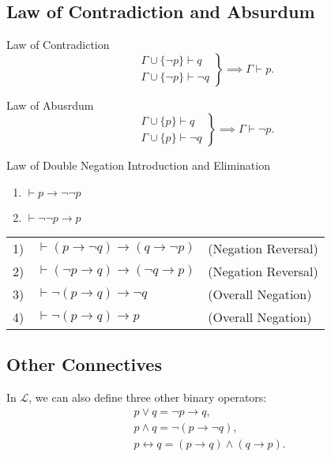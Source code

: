 \documentclass[11pt]{elegantbook}
\begin{document}
\subsection{Law of Contradiction and Absurdum}
\begin{theorem}{Law of Contradiction}
    \[
    \left.
    \begin{array}{l}
    \Gamma \cup \{\neg p\} \vdash q \\
    \Gamma \cup \{\neg p\} \vdash \neg q
    \end{array}
    \right\}
    \implies \Gamma \vdash p.
    \]
\end{theorem}

\begin{theorem}{Law of Abusrdum}
    \[
    \left.
    \begin{array}{l}
    \Gamma \cup \{p\} \vdash q \\
    \Gamma \cup \{p\} \vdash \neg q
    \end{array}
    \right\}
    \implies \Gamma \vdash \neg p.
    \]
\end{theorem}

\begin{corollary}{Law of Double Negation Introduction and Elimination}
    \begin{enumerate}
        \item \(\vdash p \to \neg\neg p\) 
        \item \(\vdash \neg\neg p \to p\) 
    \end{enumerate}
\end{corollary}

\begin{proposition}
    \begin{tabular}{@{}l l l@{}}
    1) & \(\vdash (p \to \neg q) \to (q \to \neg p)\) & \quad (Negation Reversal) \\
    2) & \(\vdash (\neg p\to q)\to (\neg q\to p)\) & \quad (Negation Reversal) \\
    3) & \(\vdash \neg(p\to q)\to \neg q\) & \quad (Overall Negation) \\
    4) & \(\vdash \neg(p\to q)\to p\) & \quad (Overall Negation) \\
    \end{tabular}
\end{proposition}

\subsection{Other Connectives}
In \({\mathcal{L}}\), we can also define three other binary operators:
\begin{align*}
&p \lor q = \neg p \to q, \\
&p \land q = \neg (p \to \neg q), \\
&p \leftrightarrow q = (p \to q) \land (q \to p).
\end{align*}
\end{document}
